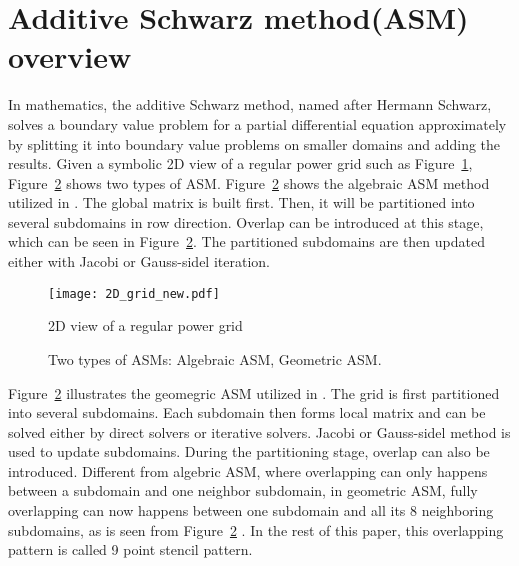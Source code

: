 \documentclass{sig-alternate}
\begin{document}
\section{Additive Schwarz method(ASM) overview}	
	In mathematics, the additive Schwarz method, named after Hermann Schwarz, solves a boundary value problem for a partial 
	differential equation approximately by splitting it into boundary value problems on smaller domains and adding the results.
	Given a symbolic 2D view of a regular power grid such as Figure~\ref{Fig1}, Figure~\ref{Fig2} shows two types of ASM. 
	Figure~\ref{Fig2} shows the algebraic ASM method utilized in \cite{kaisun}. The global matrix is built first. 
	Then, it will be partitioned into several subdomains in row direction. 
	Overlap can be introduced at this stage, which can be seen in Figure~\ref{Fig2}. The partitioned subdomains
	are then updated either with Jacobi or Gauss-sidel iteration.\\
	\begin{figure}[htbp]
	  \centering
	  \texttt{[image: 2D\_grid\_new.pdf]}
	  \caption{2D view of a regular power grid}
	  \label{Fig1}
	\end{figure}
	
	\begin{figure}[htbp]
	  \caption{Two types of ASMs: 
	   Algebraic ASM,
	   Geometric ASM.}
	  \label{Fig2}
	\end{figure}

	Figure~\ref{Fig2} illustrates the geomegric ASM utilized in \cite{Zhongyu}. The grid is first partitioned
	into several subdomains. Each subdomain then forms local matrix and can be solved either by direct solvers or iterative solvers. 
	Jacobi or Gauss-sidel method is used to update subdomains. During the partitioning stage, overlap can also be introduced.
	Different from algebric ASM, where overlapping can only happens between a subdomain and one neighbor subdomain, in geometric ASM, 
	fully overlapping can now happens between one subdomain and all its 8 neighboring subdomains, as is seen from Figure~\ref{Fig2}
	. In the rest of this paper, this overlapping pattern is called 9 point stencil pattern.\\
	
\end{document}
